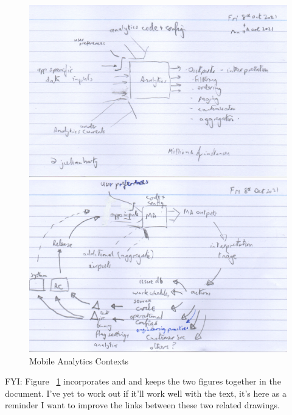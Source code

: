 \begin{figure}
\centering
\begin{minipage}{.70\textwidth}
  \centering
  \includegraphics[width=\textwidth]{images/rough-sketches/outputs_from_inputs_code_config-11-oct-2021.jpeg}
\end{minipage}\hfill%
\begin{minipage}{.70\textwidth}
  \centering
  \includegraphics[width=\textwidth]{images/rough-sketches/analytics-feedback-cycle-11-oct-2021.jpeg}
\end{minipage}
    \caption{Mobile Analytics Contexts}
    \label{fig:mobile-analytics-contexts}
\end{figure}


FYI: Figure ~\ref{fig:mobile-analytics-contexts} incorporates  and  and keeps the two figures together in the document. I've yet to work out if it'll work well with the text, it's here as a reminder I want to improve the links between these two related drawings.



